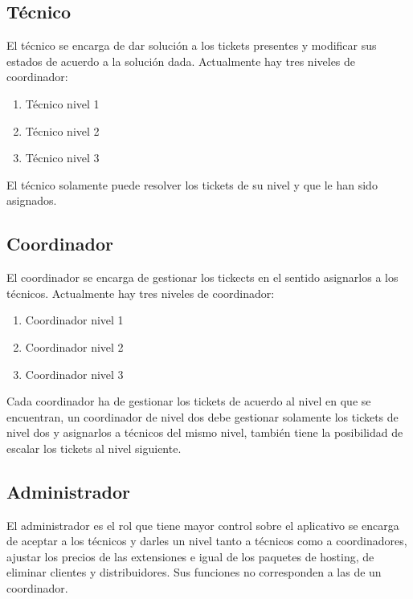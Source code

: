 \subsection{Técnico}
El técnico se encarga de dar solución a los tickets presentes y modificar sus estados de acuerdo a la solución dada. Actualmente hay tres niveles de coordinador:
\begin{enumerate}
    \item Técnico nivel 1
    \item Técnico nivel 2
    \item Técnico nivel 3
\end{enumerate}

El técnico solamente puede resolver los tickets de su nivel y que le han sido asignados.

\subsection{Coordinador}
El coordinador se encarga de gestionar los tickects en el sentido asignarlos a los técnicos. Actualmente hay tres niveles de coordinador:
\begin{enumerate}
	\item Coordinador nivel 1
	\item Coordinador nivel 2
	\item Coordinador nivel 3
\end{enumerate}

Cada coordinador ha de gestionar los tickets de acuerdo al nivel en que se encuentran, un coordinador de nivel dos debe gestionar solamente los tickets de nivel dos y asignarlos a técnicos del mismo nivel, también tiene la posibilidad de escalar los tickets al nivel siguiente.

\subsection{Administrador}
El administrador es el rol que tiene mayor control sobre el aplicativo se encarga de aceptar a los técnicos y darles un nivel tanto a técnicos como a coordinadores, ajustar los precios de las extensiones e igual de los paquetes de hosting, de eliminar clientes y distribuidores. Sus funciones no corresponden a las de un coordinador.
